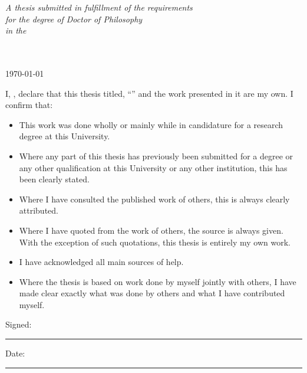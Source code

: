 \documentclass[
11pt, %
english, %
singlespacing, %
headsepline, %
]{MastersDoctoralThesis} %
\begin{document}
\begin{titlepage}
\begin{center}
\vfill

\large \textit{A thesis submitted in fulfillment of the requirements\\ for the degree of Doctor of Philosophy}\\[0.3cm] %
\textit{in the}\\[0.4cm]
\groupname\\\deptname\\[2cm] %
 
\vfill

{\large \today}\\[4cm] %
 
\vfill
\end{center}
\end{titlepage}


\begin{declaration}
\addchaptertocentry{\authorshipname} %
\noindent I, \authorname, declare that this thesis titled, \enquote{\ttitle} and the work presented in it are my own. I confirm that:

\begin{itemize} 
\item This work was done wholly or mainly while in candidature for a research degree at this University.
\item Where any part of this thesis has previously been submitted for a degree or any other qualification at this University or any other institution, this has been clearly stated.
\item Where I have consulted the published work of others, this is always clearly attributed.
\item Where I have quoted from the work of others, the source is always given. With the exception of such quotations, this thesis is entirely my own work.
\item I have acknowledged all main sources of help.
\item Where the thesis is based on work done by myself jointly with others, I have made clear exactly what was done by others and what I have contributed myself.\\
\end{itemize}
 
\noindent Signed:\\
\rule[0.5em]{25em}{0.5pt} %
 
\noindent Date:\\
\rule[0.5em]{25em}{0.5pt} %
\end{declaration}
\end{document}
